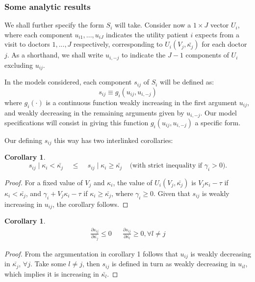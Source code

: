 \documentclass{article}
\newtheorem{corollary}[theorem]{Corollary}
\begin{document}
\subsubsection{Some analytic results}

We shall further specify the form $S_i$ will take. Consider now a $1 \times J$ vector $U_i$, where each component $u_{i1}, ... , u_{iJ}$ indicates the utility patient $i$ expects from a visit to doctors $1, ..., J$ respectively, corresponding to $U_i(V_j, \bar{\kappa_j})$ for each doctor $j$. As a shorthand, we shall write $u_{i,-j}$ to indicate the $J - 1$ components of $U_i$ excluding $u_{ij}$.

In the models considered, each component $s_{ij}$ of $S_i$ will be defined as:
\[s_{ij} \equiv g_i(u_{ij}, u_{i,-j})\]
where $g_i(\cdot)$ is a continuous function weakly increasing in the first argument $u_{ij}$, and weakly decreasing in the remaining arguments given by $u_{i,-j}$. Our model specifications will consist in giving this function $g_i(u_{ij}, u_{i,-j})$ a specific form.

Our defining $s_{ij}$ this way has two interlinked corollaries:

\begin{corollary}
\[s_{ij} \mid \kappa_i < \bar{\kappa_j} \;\;\;\; \leq     \;\;\;\; s_{ij} \mid \kappa_i \geq \bar{\kappa_j} \;\;\;\; \text{(with strict inequality if $\gamma_i > 0$).}\]
\end{corollary}

\begin{proof}
    For a fixed value of $V_j$ and $\kappa_i$, the value of $U_i(V_j, \bar{\kappa_j})$ is $V_j \kappa_i - \tau$ if $\kappa_i < \bar{\kappa_j}$, and $\gamma_i + V_j \kappa_i - \tau$ if $\kappa_i \geq \bar{\kappa_j}$, where $\gamma_i \geq 0$. Given that $s_{ij}$ is weakly increasing in $u_{ij}$, the corollary follows.
\end{proof}


\begin{corollary}
\begin{align*}
    \frac{\partial s_{ij}}{\partial\bar{\kappa_{j}}} \leq 0 &&  \frac{\partial s_{ij}}{\partial\bar{\kappa_{l}}} \geq 0, \forall l \neq j
\end{align*}   
\end{corollary}

\begin{proof}
From the argumentation in corollary 1 follows that $u_{ij}$ is weakly decreasing in $\bar{\kappa_j}$, $\forall j$. Take some $l \neq j$, then $s_{ij}$ is defined in turn as weakly decreasing in $u_{il}$, which implies it is increasing in $\bar{\kappa_l}$.
\end{proof}
\end{document}
